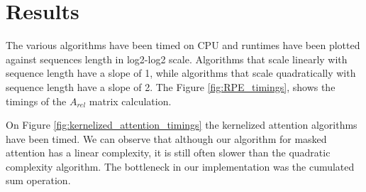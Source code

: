 \section{Results}

The various algorithms have been timed on CPU and runtimes have been plotted against sequences length in log2-log2 scale. Algorithms that scale linearly with sequence length have a slope of 1, while algorithms that scale quadratically with sequence length have a slope of 2. The Figure \ref{fig:RPE_timings}, shows the timings of the $A_{rel}$ matrix calculation.

On Figure \ref{fig:kernelized_attention_timings} the kernelized attention algorithms have been timed. We can observe that although our algorithm for masked attention has a linear complexity, it is still often slower than the quadratic complexity algorithm. The bottleneck in our implementation was the cumulated sum operation.

\endinput
